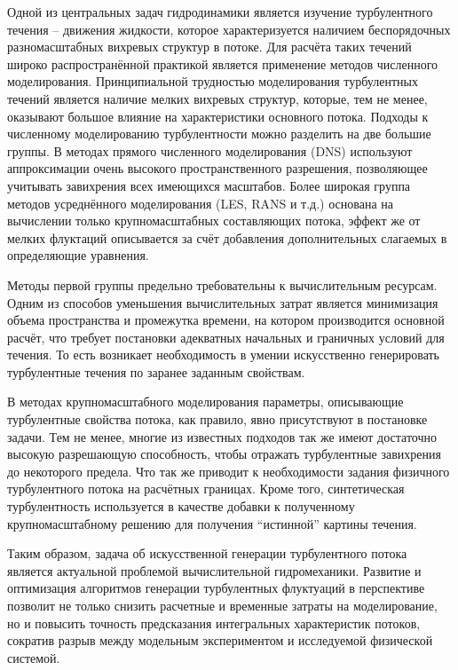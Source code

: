 Одной из центральных задач гидродинамики является изучение турбулентного течения --
движения жидкости, которое характеризуется наличием беспорядочных разномасштабных вихревых структур в потоке.
Для расчёта таких течений широко распространённой практикой является применение методов численного моделирования.
Принципиальной трудностью моделирования турбулентных течений является
наличие мелких вихревых структур, которые, тем не менее, оказывают
большое влияние на характеристики основного потока.
Подходы к численному моделированию турбулентности можно разделить на две большие группы.
В методах прямого численного моделирования (DNS) используют
аппроксимации очень высокого пространственного разрешения, позволяющее учитывать
завихрения всех имеющихся масштабов.
Более широкая группа методов усреднённого моделирования (LES, RANS и т.д.)
основана на вычислении только крупномасштабных составляющих
потока, эффект же от мелких флуктаций описывается
за счёт добавления дополнительных слагаемых
в определяющие уравнения.

Методы первой группы предельно требовательны
к вычислительным ресурсам.
Одним из способов уменьшения вычислительных затрат
является минимизация объема пространства и промежутка времени,
на котором производится основной расчёт,
что требует постановки адекватных начальных и граничных условий для течения.
То есть возникает необходимость в умении искусственно генерировать турбулентные течения
по заранее заданным свойствам.

В методах крупномасштабного моделирования
параметры, описывающие турбулентные свойства потока, как правило,
явно присутствуют в постановке задачи. Тем не менее,
многие из известных подходов так же 
имеют достаточно высокую разрешающую способность,
чтобы отражать турбулентные завихрения до некоторого предела.
Что так же приводит к необходимости задания физичного турбулентного потока
на расчётных границах.
Кроме того, синтетическая турбулентность используется в качестве добавки к полученному 
крупномасштабному решению для получения ``истинной'' картины течения.

Таким образом, задача об искусственной генерации турбулентного потока
является актуальной проблемой вычислительной гидромеханики.
Развитие и оптимизация алгоритмов генерации турбулентных флуктуаций в перспективе позволит
не только снизить расчетные и временные затраты на моделирование,
но и повысить точность предсказания интегральных характеристик потоков,
сократив разрыв между модельным экспериментом и исследуемой физической системой. 

